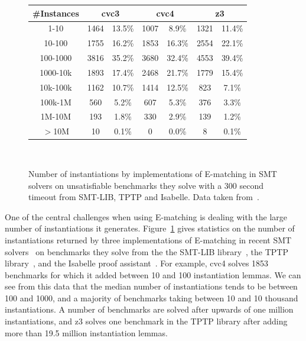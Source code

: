 \documentclass[oribibl]{llncs}
\begin{document}
\begin{figure}[t]
\centering
{
\begin{tabular}{|c|cc|cc|cc|}      
\hline                                                                      
\#Instances & \multicolumn{2}{c|}{{\bf cvc3}} & \multicolumn{2}{c|}{{\bf cvc4}} & \multicolumn{2}{c|}{{\bf z3}} \\
\hline   
1-10 & 1464 & 13.5\% & 1007 & 8.9\% & 1321 & 11.4\% \\
10-100 & 1755 & 16.2\% & 1853 & 16.3\% & 2554 & 22.1\% \\
100-1000 & 3816 & 35.2\% & 3680 & 32.4\% & 4553 & 39.4\% \\
1000-10k & 1893 & 17.4\% & 2468 & 21.7\% & 1779 & 15.4\% \\
10k-100k & 1162 & 10.7\% & 1414 & 12.5\% & 823 & 7.1\% \\
100k-1M & 560 & 5.2\% & 607 & 5.3\% & 376 & 3.3\% \\
1M-10M & 193 & 1.8\% & 330 & 2.9\% & 139 & 1.2\% \\
$>$10M & 10 & 0.1\% & 0 & 0.0\% & 8 & 0.1\%  \\                           
\hline                                                                
\end{tabular}
\\
}
\caption{Number of instantiations by implementations of E-matching in SMT solvers
on unsatisfiable benchmarks they solve with a 300 second timeout from SMT-LIB, TPTP and Isabelle. Data taken from~\cite{ReynoldsTinelliMoura14}.}
\label{fig:results-inst}
\end{figure}

One of the central challenges when using E-matching is dealing with the large number of instantiations it generates.
Figure~\ref{fig:results-inst} gives statistics on the number of instantiations returned by three implementations of E-matching in recent SMT solvers~\cite{DBLP:conf/cav/BarrettT07,CVC4-CAV-11,Z3}
on benchmarks they solve from the the SMT-LIB library~\cite{BarST-SMTLIB}, the TPTP library~\cite{SS98}, 
and the Isabelle proof assistant~\cite{blanchette2013extending}.
For example, cvc4 solves 1853 benchmarks for which it added between 10 and 100 instantiation lemmas.
We can see from this data that the median number of instantiations tends to be between 100 and 1000,
and a majority of benchmarks taking between 10 and 10 thousand instantiations.
A number of benchmarks are solved after upwards of one million instantiations,
and z3 solves one benchmark in the TPTP library after adding more than 19.5 million instantiation lemmas.
\end{document}
